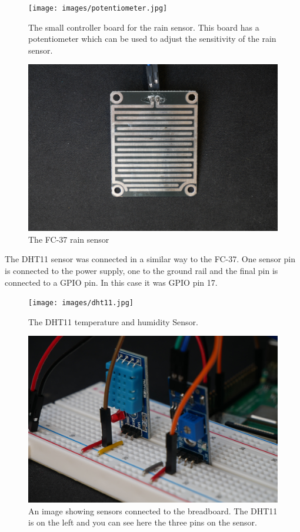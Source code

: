 \documentclass[10pt,a4paper]{article}
\begin{document}
\begin{figure}[H]
  \centering
    \texttt{[image: images/potentiometer.jpg]}
    \caption{The small controller board for the rain sensor. This board has a potentiometer which can be used to adjust the sensitivity of the rain sensor.}
    \label{fig:potentiometer}
\end{figure}

\begin{figure}[H]
  \centering
    \includegraphics[width=\linewidth]{images/rainPanel.jpg}
    \caption{The FC-37 rain sensor}
    \label{fig:rain panel}
\end{figure}

The DHT11 sensor was connected in a similar way to the FC-37. One sensor pin is connected to the power supply, one to the ground rail and the final pin is connected to a GPIO pin. In this case it was GPIO pin 17. 

\begin{figure}[H]
  \centering
    \texttt{[image: images/dht11.jpg]}
    \caption{The DHT11 temperature and humidity Sensor.}
    \label{fig:dht11}
\end{figure}

\begin{figure}[H]
  \centering
    \includegraphics[width=\linewidth]{images/sensorCloseup.jpg}
    \caption{An image showing sensors connected to the breadboard. The DHT11 is on the left and you can see here the three pins on the sensor.}
    \label{fig:piCam}
\end{figure}
\end{document}

